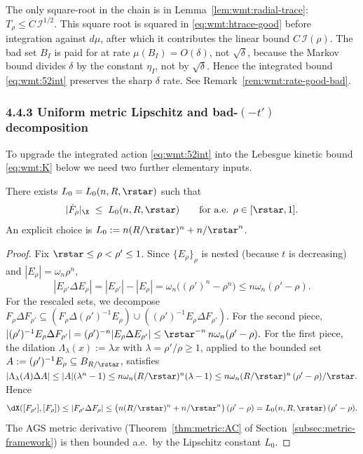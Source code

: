 \begin{remark}
The only square-root in the chain is in
Lemma~\ref{lem:wmt:radial-trace}: $T_\rho\le C\,\mathcal I^{1/2}$. This
square root is squared in \eqref{eq:wmt:htrace-good} before integration
against $d\mu$, after which it contributes the linear bound $C\,\mathcal
I(\rho)$. The bad set $B_I$ is paid for at rate $\mu(B_I)=O(\delta)$,
not $\sqrt{\delta}$, because the Markov bound divides $\delta$ by the
constant $\eta_I$, not by $\sqrt{\delta}$. Hence the integrated bound
\eqref{eq:wmt:52int} preserves the sharp $\delta$ rate. See
Remark~\ref{rem:wmt:rate-good-bad}.
\end{remark}

\subsubsection{4.4.3 Uniform metric Lipschitz and bad-$(-t')$ decomposition}
\label{subsec:wmt:A0-badtprime}

To upgrade the integrated action \eqref{eq:wmt:52int} into the Lebesgue
kinetic bound \eqref{eq:wmt:K} below we need two further elementary
inputs.

\begin{lemma}\label{lem:wmt:A0}
There exists $L_0=L_0(n,R,\rstar)$ such that
\begin{equation}\label{eq:wmt:A0}
   |\dot F_\rho|_{\X}\;\le\; L_0(n,R,\rstar)
   \qquad\text{for a.e. }\rho\in[\rstar,1].
\end{equation}
An explicit choice is $L_0:=n(R/\rstar)^n+n/\rstar^n$.
\end{lemma}

\begin{proof}
Fix $\rstar\le \rho<\rho'\le 1$. Since $\{E_\rho\}_\rho$ is nested
(because $t$ is decreasing) and $|E_\rho|=\omega_n\rho^n$,
\[
   |E_{\rho'}\Delta E_\rho|=|E_{\rho'}|-|E_\rho|
   =\omega_n\bigl((\rho')^n-\rho^n\bigr)
   \le n\omega_n(\rho'-\rho).
\]
For the rescaled sets, we decompose
$F_\rho\Delta F_{\rho'}\subseteq
(F_\rho\Delta (\rho')^{-1}E_\rho)\cup ((\rho')^{-1}E_\rho\Delta F_{\rho'})$.
For the second piece,
\(|(\rho')^{-1}E_\rho\Delta F_{\rho'}|
=(\rho')^{-n}|E_\rho\Delta E_{\rho'}|
\le \rstar^{-n}\,n\omega_n(\rho'-\rho).\)
For the first piece, the dilation
$\Lambda_\lambda(x):=\lambda x$ with $\lambda=\rho'/\rho\ge 1$, applied
to the bounded set $A:=(\rho')^{-1}E_\rho\subseteq B_{R/\rstar}$,
satisfies
\(|\Lambda_\lambda(A)\Delta A|\le|A|(\lambda^n-1)
\le n\omega_n(R/\rstar)^n(\lambda-1)
\le n\omega_n(R/\rstar)^n\,(\rho'-\rho)/\rstar.\)
Hence
\[
   \dX([F_{\rho'}],[F_\rho])
   \le |F_{\rho'}\Delta F_\rho|
   \le \bigl(n(R/\rstar)^n+n/\rstar^n\bigr)\,(\rho'-\rho)
   = L_0(n,R,\rstar)\,(\rho'-\rho).
\]
The AGS metric derivative (Theorem~\ref{thm:metric:AC} of
Section~\ref{subsec:metric-framework}) is then bounded a.e.\ by the
Lipschitz constant $L_0$.
\end{proof}


